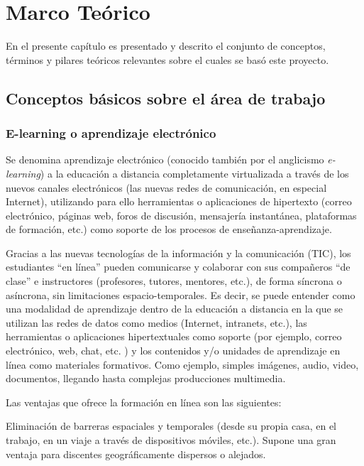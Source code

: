 \chapter{Marco Teórico}
\thispagestyle{empty} %

En el presente capítulo es presentado y descrito el conjunto de conceptos, términos y pilares teóricos relevantes sobre el cuales se basó este proyecto.

\section{Conceptos básicos sobre el área de trabajo}

\subsection{E-learning o aprendizaje electrónico}

Se denomina aprendizaje electrónico (conocido también por el anglicismo \emph{e-learning}) a la educación a distancia completamente virtualizada a través de los nuevos canales electrónicos (las nuevas redes de comunicación, en especial Internet), utilizando para ello herramientas o aplicaciones de hipertexto (correo electrónico, páginas web, foros de discusión, mensajería instantánea, plataformas de formación, etc.) como soporte de los procesos de enseñanza-aprendizaje.

Gracias a las nuevas tecnologías de la información y la comunicación (TIC), los estudiantes ``en línea'' pueden comunicarse y colaborar con sus compañeros ``de clase'' e instructores (profesores, tutores, mentores, etc.), de forma síncrona o asíncrona, sin limitaciones espacio-temporales. Es decir, se puede entender como una modalidad de aprendizaje dentro de la educación a distancia en la que se utilizan las redes de datos como medios (Internet, intranets, etc.), las herramientas o aplicaciones hipertextuales como soporte (por ejemplo, correo electrónico, web, chat, etc. ) y los contenidos y/o unidades de aprendizaje en línea como materiales formativos. Como ejemplo, simples imágenes, audio, video, documentos, llegando hasta complejas producciones multimedia.

Las ventajas que ofrece la formación en línea son las siguientes:

Eliminación de barreras espaciales y temporales (desde su propia casa, en el trabajo, en un viaje a través de dispositivos móviles, etc.). Supone una gran ventaja para discentes geográficamente dispersos o alejados.

